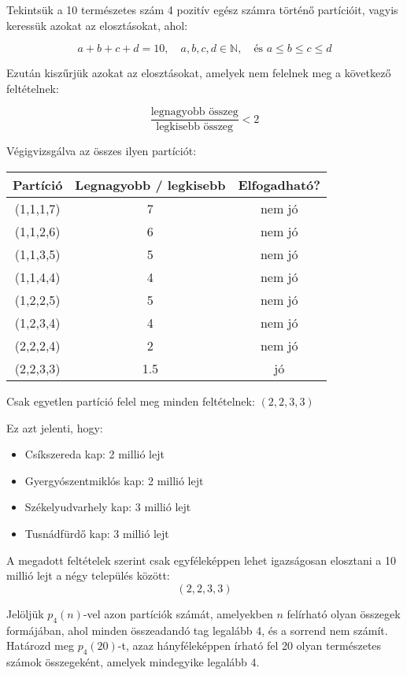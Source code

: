 \begin{solution}
Tekintsük a 10 természetes szám 4 pozitív egész számra történő partícióit,
vagyis keressük azokat az elosztásokat, ahol:

\[
a+b+c+d=10,\quad a,b,c,d\in\mathbb{N},\quad\text{és }a\leq b\leq c\leq d
\]

Ezután kiszűrjük azokat az elosztásokat, amelyek nem felelnek meg
a következő feltételnek:

\[
\frac{\text{legnagyobb összeg}}{\text{legkisebb összeg}}<2
\]

Végigvizsgálva az összes ilyen partíciót:
\begin{center}
\begin{tabular}{|c|c|c|}
\hline 
\textbf{Partíció} & \textbf{Legnagyobb / legkisebb} & \textbf{Elfogadható?}\tabularnewline
\hline 
(1,1,1,7) & 7 & nem jó\tabularnewline
(1,1,2,6) & 6 & nem jó\tabularnewline
(1,1,3,5) & 5 & nem jó\tabularnewline
(1,1,4,4) & 4 & nem jó\tabularnewline
(1,2,2,5) & 5 & nem jó\tabularnewline
(1,2,3,4) & 4 & nem jó\tabularnewline
(2,2,2,4) & 2 & nem jó\tabularnewline
(2,2,3,3) & 1.5 & jó\tabularnewline
\hline 
\end{tabular}
\par\end{center}
Csak egyetlen partíció felel meg minden feltételnek: $(2,2,3,3)$

Ez azt jelenti, hogy:
\begin{itemize}
\item Csíkszereda kap: 2 millió lejt 
\item Gyergyószentmiklós kap: 2 millió lejt 
\item Székelyudvarhely kap: 3 millió lejt 
\item Tusnádfürdő kap: 3 millió lejt 
\end{itemize}
A megadott feltételek szerint csak egyféleképpen lehet igazságosan
elosztani a 10 millió lejt a négy település között: 
\[
\boxed{(2,2,3,3)}
\]
\end{solution}
\begin{extraproblem}
Jelöljük $p_{4}(n)$-vel azon partíciók számát, amelyekben $n$ felírható
olyan összegek formájában, ahol minden összeadandó tag legalább 4,
és a sorrend nem számít. Határozd meg $p_{4}(20)$-t, azaz hányféleképpen
írható fel 20 olyan természetes számok összegeként, amelyek mindegyike
legalább 4. 
\end{extraproblem}
